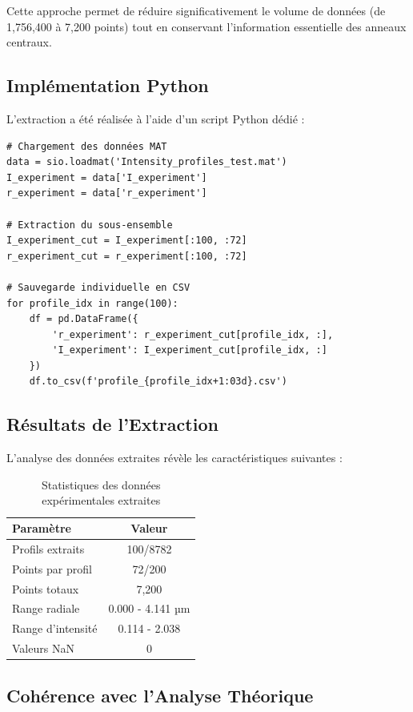 \documentclass[twocolumn,10pt]{article}
\begin{document}
Cette approche permet de réduire significativement le volume de données (de 1,756,400 à 7,200 points) tout en conservant l'information essentielle des anneaux centraux.

\subsection{Implémentation Python}

L'extraction a été réalisée à l'aide d'un script Python dédié :

\begin{lstlisting}[style=python, caption=Script d'extraction des données expérimentales]
# Chargement des données MAT
data = sio.loadmat('Intensity_profiles_test.mat')
I_experiment = data['I_experiment']
r_experiment = data['r_experiment']

# Extraction du sous-ensemble
I_experiment_cut = I_experiment[:100, :72]
r_experiment_cut = r_experiment[:100, :72]

# Sauvegarde individuelle en CSV
for profile_idx in range(100):
    df = pd.DataFrame({
        'r_experiment': r_experiment_cut[profile_idx, :],
        'I_experiment': I_experiment_cut[profile_idx, :]
    })
    df.to_csv(f'profile_{profile_idx+1:03d}.csv')
\end{lstlisting}

\subsection{Résultats de l'Extraction}

L'analyse des données extraites révèle les caractéristiques suivantes :

\begin{table}[H]
\centering
\caption{Statistiques des données expérimentales extraites}
\begin{tabular}{|l|c|}
\hline
\textbf{Paramètre} & \textbf{Valeur} \\
\hline
Profils extraits & 100/8782 \\
Points par profil & 72/200 \\
Points totaux & 7,200 \\
Range radiale & 0.000 - 4.141 µm \\
Range d'intensité & 0.114 - 2.038 \\
Valeurs NaN & 0 \\
\hline
\end{tabular}
\end{table}

\subsection{Cohérence avec l'Analyse Théorique}
\end{document}
